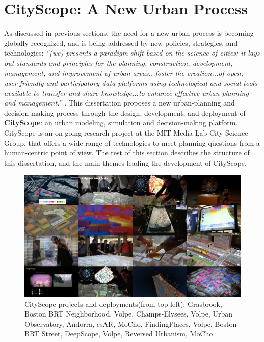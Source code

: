 {    %

    \section{CityScope: A New Urban Process}
     {
      As discussed in previous sections, the need for a new urban process is becoming globally recognized, and is being addressed by new policies, strategies, and technologies: \textit{``(we) presents a paradigm shift based on the science of cities; it lays out standards and principles for the planning, construction, development, management, and improvement of urban areas...foster the creation...of open, user-friendly and participatory data platforms using technological and social tools available to transfer and share knowledge...to enhance effective urban-planning and management.''} \cite{habitat2016new}.
      \newline
      This dissertation proposes a new urban-planning and decision-making process through the design, development, and deployment of \textbf{CityScope}: an urban modeling, simulation and decision-making platform. CityScope is an on-going research project at the MIT Media Lab City Science Group, that offers a wide range of technologies to meet planning questions from a human-centric point of view. The rest of this section describes the structure of this dissertation, and the main themes leading the development of CityScope.
     }

    \begin{figure}[!htb]
        \begin{center}
            \includegraphics[width=1\linewidth]{chapters/introduction/figures/all_projects.png}
        \end{center}
        \caption{CityScope projects and deployments(from top left): Grasbrook, Boston BRT Neighborhood, Volpe, Champs-Elysees, Volpe, Urban Observatory, Andorra, csAR, MoCho, FindingPlaces, Volpe, Boston BRT Street, DeepScope, Volpe, Reversed Urbanism, MoCho}
        \label{fig:all_projects}
    \end{figure}

}
